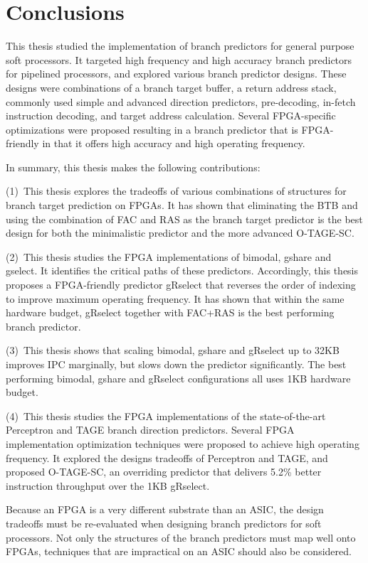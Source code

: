 \chapter{Conclusions}
\label{chap:conclusion}

This thesis studied the implementation of branch predictors for general purpose soft processors. It targeted high frequency and high accuracy branch predictors for pipelined processors, and explored various branch predictor designs. These designs were combinations of a branch target buffer, a return address stack, commonly used simple and advanced direction predictors, pre-decoding, in-fetch instruction decoding, and target address calculation. Several FPGA-specific optimizations were proposed resulting in a branch predictor that is FPGA-friendly in that it offers high accuracy and high operating frequency.

In summary, this thesis makes the following contributions:

(1)~This thesis explores the tradeoffs of various combinations of structures for branch target prediction on FPGAs. It has shown that eliminating the BTB and using the combination of FAC and RAS as the branch target predictor is the best design for both the minimalistic predictor and the more advanced \mbox{O-TAGE-SC}.

(2)~This thesis studies the FPGA implementations of bimodal, gshare and gselect. It identifies the critical paths of these predictors. Accordingly, this thesis proposes a FPGA-friendly predictor gRselect that reverses the order of indexing to improve maximum operating frequency. It has shown that within the same hardware budget, gRselect together with FAC+RAS is the best performing branch predictor.

(3)~This thesis shows that scaling bimodal, gshare and gRselect up to 32KB improves IPC marginally, but slows down the predictor significantly. The best performing bimodal, gshare and gRselect configurations all uses 1KB hardware budget.

(4)~This thesis studies the FPGA implementations of the state-of-the-art Perceptron and TAGE branch direction predictors. Several FPGA implementation optimization techniques were proposed to achieve high operating frequency. It explored the designs tradeoffs of Perceptron and TAGE, and proposed \mbox{O-TAGE-SC}, an overriding predictor that delivers 5.2\% better instruction throughput over the 1KB gRselect.

Because an FPGA is a very different substrate than an ASIC, the design tradeoffs must be re-evaluated when designing branch predictors for soft processors. Not only the structures of the branch predictors must map well onto FPGAs, techniques that are impractical on an ASIC should also be considered.

